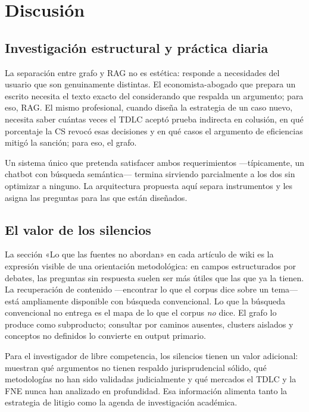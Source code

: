 \documentclass[12pt,a4paper]{article}
\begin{document}
\section{Discusión}
\label{sec:discusion}

\subsection{Investigación estructural y práctica diaria}

La separación entre grafo y RAG no es estética: responde a necesidades del
usuario que son genuinamente distintas. El economista-abogado que prepara un
escrito necesita el texto exacto del considerando que respalda un argumento;
para eso, RAG. El mismo profesional, cuando diseña la estrategia de un caso
nuevo, necesita saber cuántas veces el TDLC aceptó prueba indirecta en colusión,
en qué porcentaje la CS revocó esas decisiones y en qué casos el argumento de
eficiencias mitigó la sanción; para eso, el grafo.

Un sistema único que pretenda satisfacer ambos requerimientos —típicamente, un
chatbot con búsqueda semántica— termina sirviendo parcialmente a los dos sin
optimizar a ninguno. La arquitectura propuesta aquí separa instrumentos y les
asigna las preguntas para las que están diseñados.

\subsection{El valor de los silencios}

La sección «Lo que las fuentes no abordan» en cada artículo de wiki es la
expresión visible de una orientación metodológica: en campos estructurados por
debates, las preguntas sin respuesta suelen ser más útiles que las que ya la
tienen.\autocite{schrepel2026brain} La recuperación de contenido —encontrar lo
que el corpus dice sobre un tema— está ampliamente disponible con búsqueda
convencional. Lo que la búsqueda convencional no entrega es el mapa de lo que
el corpus \emph{no} dice. El grafo lo produce como subproducto; consultar por
caminos ausentes, clusters aislados y conceptos no definidos lo convierte en
output primario.

Para el investigador de libre competencia, los silencios tienen un valor
adicional: muestran qué argumentos no tienen respaldo jurisprudencial sólido,
qué metodologías no han sido validadas judicialmente y qué mercados el TDLC y la
FNE nunca han analizado en profundidad. Esa información alimenta tanto la
estrategia de litigio como la agenda de investigación académica.
\end{document}
